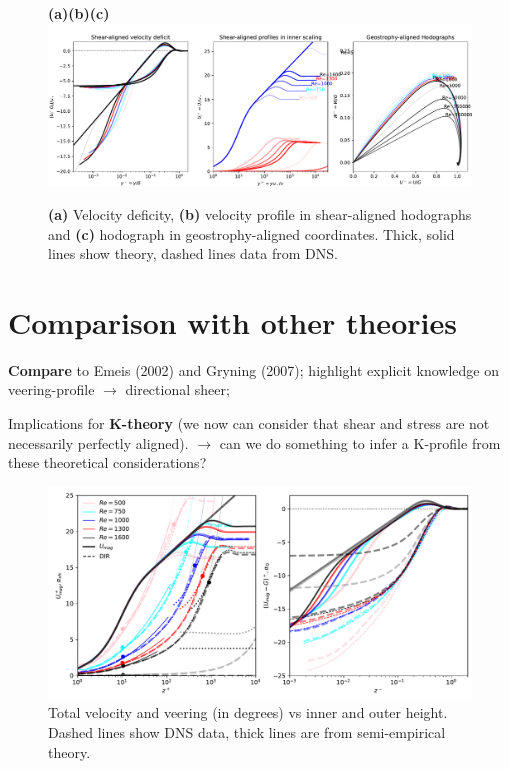 \documentclass[a4paper,11pt]{amsart}
\begin{document}
\begin{figure}
  \phantom{AAA}\textbf{(a)\hspace{0.3\textwidth}(b)\hspace{0.3\textwidth}(c)}\\
  \includegraphics[width=\textwidth]{../plot/ekman_profiles.pdf}
  \caption{ \textbf{(a)} Velocity deficity, \textbf{(b)} velocity profile in shear-aligned hodographs and \textbf{(c)} hodograph in geostrophy-aligned coordinates.
    Thick, solid lines show theory, dashed lines data from DNS. }
  \label{fig:hodograph} 
\end{figure} 

\section{Comparison with other theories}

\textbf{Compare} to Emeis (2002) and Gryning (2007); highlight explicit knowledge on veering-profile $\rightarrow$ directional sheer;
%
\par%
%
Implications for \textbf{K-theory} (we now can consider that shear and stress are not necessarily perfectly aligned).
$\rightarrow$ can we do something to infer a K-profile from these theoretical considerations? 
%
\begin{figure}
  \includegraphics[width=\textwidth]{../plot/mag_dir.pdf} 
  \caption{Total velocity and veering (in degrees) vs inner and outer height.
    Dashed lines show DNS data, thick lines are from semi-empirical theory.} 
\end{figure} 
%
\end{document}
